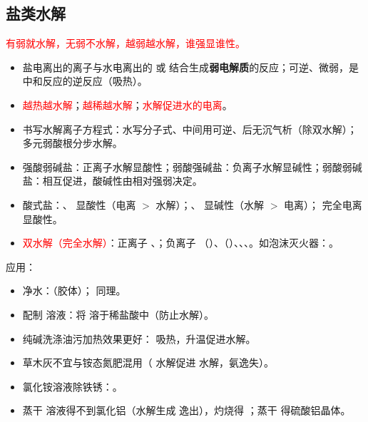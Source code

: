        \subsection{盐类水解}

            \textcolor{red}{有弱就水解，无弱不水解，越弱越水解，谁强显谁性。}

            \begin{itemize}
                \item 盐电离出的离子与水电离出的  或  结合生成\textbf{弱电解质}的反应；可逆、微弱，是中和反应的逆反应（吸热）。
                \item \textcolor{red}{越热越水解}；\textcolor{red}{越稀越水解}；\textcolor{red}{水解促进水的电离}。
                \item 书写水解离子方程式：水写分子式、中间用可逆、后无沉气析（除双水解）；多元弱酸根分步水解。
                \item 强酸弱碱盐：正离子水解显酸性；弱酸强碱盐：负离子水解显碱性；弱酸弱碱盐：相互促进，酸碱性由相对强弱决定。
                \item 酸式盐：、 显酸性（电离 \(>\) 水解）；、 显碱性（水解 \(>\) 电离）； 完全电离显酸性。
                \item \textcolor{red}{双水解（完全水解）}：正离子 、；负离子 （）、（）、、、。如泡沫灭火器：。
            \end{itemize}

            应用：

            \begin{itemize}
                \item 净水：（胶体）； 同理。
                \item 配制  溶液：将  溶于稀盐酸中（防止水解）。
                \item 纯碱洗涤油污加热效果更好： 吸热，升温促进水解。
                \item 草木灰不宜与铵态氮肥混用（ 水解促进  水解，氨逸失）。
                \item 氯化铵溶液除铁锈：。
                \item 蒸干  溶液得不到氯化铝（水解生成  逸出），灼烧得 ；蒸干  得硫酸铝晶体。
            \end{itemize}

